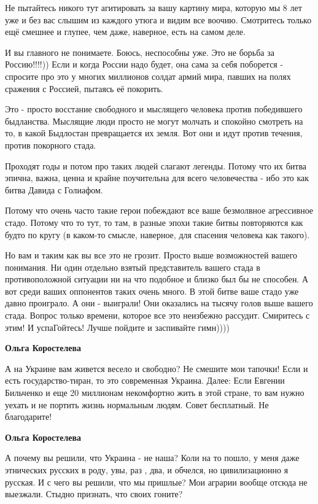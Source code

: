 \begin{itemize}
\begin{itemize}
Не пытайтесь никого тут агитировать за вашу картину мира, которую мы 8 лет уже
и без вас слышим из каждого утюга и видим все воочию. Смотритесь только ещё
смешнее и глупее, чем даже, наверное, есть на самом деле.

И вы главного не понимаете. Боюсь, неспособны уже. Это не борьба за
Россию!!!!)) Если и когда России надо будет, она сама за себя поборется -
спросите про это у многих миллионов солдат армий мира, павших на полях сражения
с Россией, пытаясь её покорить. 

Это - просто восстание свободного и мыслящего человека против победившего
быдланства. Мыслящие люди просто не могут молчать и спокойно смотреть на то, в
какой Быдлостан превращается их земля. Вот они и идут против течения, против
покорного стада. 

Проходят годы и потом про таких людей слагают легенды. Потому что их битва
эпична, важна, ценна и крайне поучительна для всего человечества - ибо это как
битва Давида с Голиафом.

Потому что очень часто такие герои побеждают все ваше безмолвное агрессивное
стадо. Потому что то тут, то там, в разные эпохи такие битвы повторяются как
будто по кругу (в каком-то смысле, наверное, для спасения человека как такого).

Но вам и таким как вы все это не грозит. Просто выше возможностей вашего
понимания. Ни один отдельно взятый представитель вашего стада в противоположной
ситуации ни на что подобное и близко был бы не способен. А вот среди ваших
оппонентов таких очень много. В этой битве ваше стадо уже давно проиграло. А
они - выиграли! Они оказались на тысячу голов выше вашего стада. Вопрос только
времени, которое все это неизбежно рассудит. Смиритесь с этим! И успаГойтесь!
Лучше пойдите и заспивайте гимн))))

\textbf{Ольга Коростелева} 

А на Украине вам живется весело и свободно? Не смешите мои тапочки! Если и есть
государство-тиран, то это современная Украина. Далее: Если Евгении Бильченко и
еще 20 миллионам некомфортно жить в этой стране, то вам нужно уехать и не
портить жизнь нормальным людям. Совет бесплатный. Не благодарите!


\textbf{Ольга Коростелева} 

А почему вы решили, что Украина - не наша? Коли на то пошло, у меня даже
этнических русских в роду, увы, раз , два, и обчелся, но цивилизационно я
русская. И с чего вы решили, что мы пришлые? Мои аграрии вообще отсюда не
выезжали. Стыдно признать, что своих гоните?


\end{itemize}
\end{itemize}
